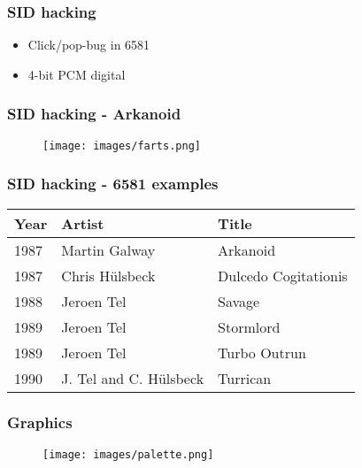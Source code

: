 \documentclass[aspectratio=43]{uva-inf-presentation}
\begin{document}

\begin{frame}
\frametitle{SID hacking}

\begin{itemize}
\item Click/pop-bug in 6581
\item 4-bit PCM digital
\end{itemize}

\end{frame}


\begin{frame}
\frametitle{SID hacking - Arkanoid}

\begin{figure}
\texttt{[image: images/farts.png]}
\end{figure}

\end{frame}


\begin{frame}
\frametitle{SID hacking - 6581 examples}

\begin{tabular}{|l|l|l|}
\hline Year & Artist & Title \\ \hline
1987 & Martin Galway & Arkanoid \\
1987 & Chris H\"ulsbeck & Dulcedo Cogitationis \\
1988 & Jeroen Tel & Savage \\
1989 & Jeroen Tel & Stormlord \\
1989 & Jeroen Tel & Turbo Outrun \\
1990 & J. Tel and C. H\"ulsbeck & Turrican \\ \hline
\end{tabular}

\end{frame}


\begin{frame}
\frametitle{Graphics}

\begin{figure}
\texttt{[image: images/palette.png]}
\end{figure}

\end{frame}
\end{document}
